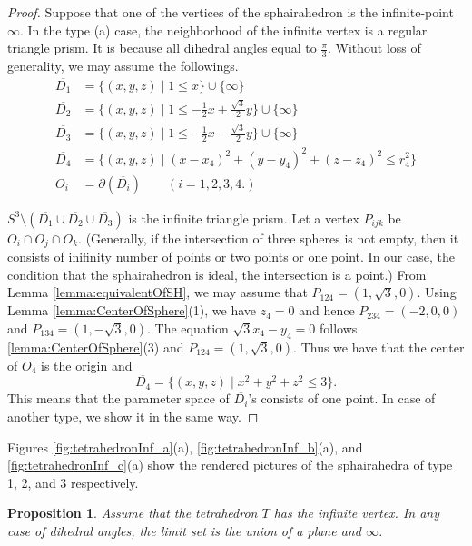 \documentclass[suppldata, dvipdfmx]{interact}
\theoremstyle{plain}%
\newtheorem{proposition}[theorem]{Proposition}
\theoremstyle{definition}
\theoremstyle{remark}
\theoremstyle{problemstyle}
\begin{document}
\begin{proof}   Suppose that one of the vertices of the sphairahedron is the infinite-point $\infty$.  In the type (a) case, the neighborhood of the infinite vertex is a regular triangle prism.  It is because all dihedral angles equal to $\frac{\pi}{3}$.  Without loss of generality, we may assume the followings.
\begin{align*}
\overline{D_1}&=\{(x,y,z) \mid 1 \le x \} \cup\{\infty\}\\
\overline{D_2}&=\{(x,y,z) \mid 1 \le -\frac{1}{2}x+\frac{\sqrt{3}}{2}y \} \cup\{\infty\}\\
\overline{D_3}&=\{(x,y,z) \mid 1 \le -\frac{1}{2}x-\frac{\sqrt{3}}{2}y \} \cup\{\infty\}\\
\overline{D_4}&=\{(x,y,z) \mid (x-x_4)^2+(y-y_4)^2+(z-z_4)^2 \le r_4^2\} \\
O_i & = \partial(\overline{D_i}) \qquad(i=1, 2, 3, 4.)
\end{align*}

$S^3\setminus(\overline{D_1} \cup \overline{D_2} \cup \overline{D_3})$ is the infinite triangle prism.  Let a vertex $P_{ijk}$ be $O_i \cap O_j \cap O_k$. (Generally, if the intersection of three spheres is not empty, then it consists of inifinity number of points or two points or one point.  In our case, the condition that the sphairahedron is ideal, the intersection is a point.) From Lemma \ref{lemma:equivalentOfSH}, we may assume that $P_{124}=(1,\sqrt{3}, 0)$.  Using Lemma \ref{lemma:CenterOfSphere}(1), we have $z_4=0$ and hence $P_{234}=(-2, 0, 0)$ and $P_{134}=(1, -\sqrt{3}, 0)$.  The equation $\sqrt{3}x_4 -y_4=0$ follows \ref{lemma:CenterOfSphere}(3) and $P_{124}=(1,\sqrt{3}, 0)$.  Thus we have that the center of $O_4$ is the origin and 
\[
\overline{D_4}=\{(x,y,z) \mid x^2+y^2+z^2 \le 3 \}.
\]   
This means that the parameter space of $\overline{D_i}$'s consists of one point.  In case of another type, we show it in the same way.
\end{proof}

Figures  \ref{fig:tetrahedronInf_a}(a), \ref{fig:tetrahedronInf_b}(a),
and \ref{fig:tetrahedronInf_c}(a) show the rendered pictures of the sphairahedra of type 1, 2, and 3 respectively.

\begin{proposition} \label{prop:tetrahedronLimitSet}
Assume that the tetrahedron $T$ has the infinite vertex.  In any case of dihedral angles, the limit set is the union of a plane and $\infty$.
\end{proposition}
\end{document}
